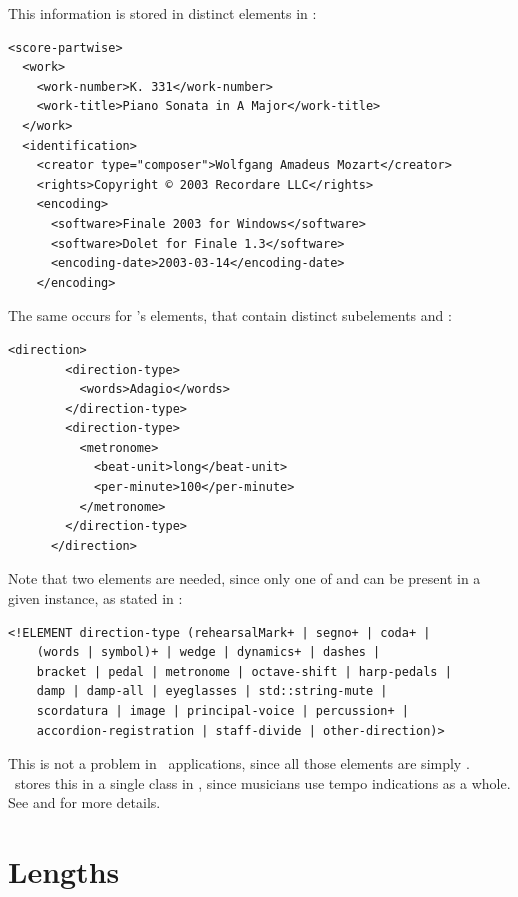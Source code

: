 This information is stored in distinct elements in \mxml:
\begin{lstlisting}[language=MusicXML]
<score-partwise>
  <work>
    <work-number>K. 331</work-number>
    <work-title>Piano Sonata in A Major</work-title>
  </work>
  <identification>
    <creator type="composer">Wolfgang Amadeus Mozart</creator>
    <rights>Copyright © 2003 Recordare LLC</rights>
    <encoding>
      <software>Finale 2003 for Windows</software>
      <software>Dolet for Finale 1.3</software>
      <encoding-date>2003-03-14</encoding-date>
    </encoding>
\end{lstlisting}

The same occurs for \mxml's  elements, that contain distinct subelements  and :
\begin{lstlisting}[language=MusicXML]
      <direction>
        <direction-type>
          <words>Adagio</words>
        </direction-type>
        <direction-type>
          <metronome>
            <beat-unit>long</beat-unit>
            <per-minute>100</per-minute>
          </metronome>
        </direction-type>
      </direction>
\end{lstlisting}

Note that two  elements are needed, since only one of  and  can be present in a given instance, as stated in :
\begin{lstlisting}[language=MusicXML]
<!ELEMENT direction-type (rehearsalMark+ | segno+ | coda+ |
	(words | symbol)+ | wedge | dynamics+ | dashes |
	bracket | pedal | metronome | octave-shift | harp-pedals |
	damp | damp-all | eyeglasses | std::string-mute |
	scordatura | image | principal-voice | percussion+ |
	accordion-registration | staff-divide | other-direction)>
\end{lstlisting}

This is not a problem in \GUI\ applications, since all those elements are simply \drawn. \msrRepr\ stores this in a single  class   in , since musicians use tempo indications as a whole.
See  and  for more details.


\section{Lengths}\label{Lengths}

